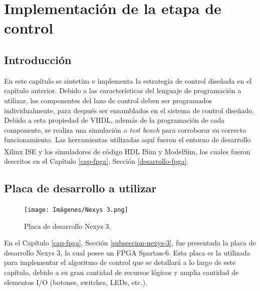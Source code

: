 \chapter{Implementación de la etapa de control}
\label{implementacion-control}

\section{Introducción}

En este capítulo se sintetiza e implementa la estrategia de control diseñada en el capítulo anterior. Debido a las características del lenguaje de programación a utilizar, los componentes del lazo de control deben ser programados individualmente, para después ser ensamblados en el sistema de control diseñado. Debido a esta propiedad de VHDL, además de la programación de cada componente, se realiza una simulación o \emph{test bench} para corroborar su correcto funcionamiento. Las herramientas utilizadas aquí fueron el entorno de desarrollo Xilinx ISE\textsuperscript\textregistered \hspace{0.6pt} y los simuladores de código HDL ISim\textsuperscript\textregistered \hspace{0.6pt} y ModelSim\textsuperscript\textregistered\hspace{0.6pt}, los cuales fueron descritos en el Capítulo \ref{cap-fpga}, Sección \ref{desarrollo-fpga}.

\section{Placa de desarrollo a utilizar}

\begin{figure}
    \vspace{-15pt}
    \begin{center}
      \texttt{[image: Imágenes/Nexys 3.png]}
    \end{center}
    \caption{Placa de desarrollo Nexys 3.}
    \label{nexys3}
  \end{figure}

En el Capítulo \ref{cap-fpga}, Sección \ref{subseccion-nexys-3}, fue presentada la placa de desarrollo Nexys 3, la cual posee un FPGA Spartan-6. Esta placa es la utilizada para implementar el algoritmo de control que se detallará a lo largo de este capítulo, debido a su gran cantidad de recursos lógicos y amplia cantidad de elementos I/O (botones, switches, LEDs, etc.).

